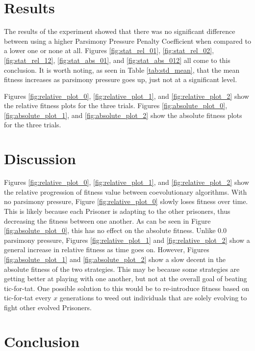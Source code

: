 \documentclass[times]{article}
\begin{document}
	\section{Results}

	The results of the experiment showed that there was no significant difference between using a higher Parsimony Pressure Penalty Coefficient when compared to a lower one or none at all. Figures \ref{fig:stat_rel_01}, \ref{fig:stat_rel_02}, \ref{fig:stat_rel_12}, \ref{fig:stat_abs_01}, and \ref{fig:stat_abs_012} all come to this conclusion. It is worth noting, as seen in Table \ref{tab:std_mean}, that the mean fitness increases as parsimony pressure goes up, just not at a significant level.

	Figures \ref{fig:relative_plot_0}, \ref{fig:relative_plot_1}, and \ref{fig:relative_plot_2} show the relative fitness plots for the three trials. Figures \ref{fig:absolute_plot_0}, \ref{fig:absolute_plot_1}, and \ref{fig:absolute_plot_2} show the absolute fitness plots for the three trials.

	\section{Discussion}

	Figures \ref{fig:relative_plot_0}, \ref{fig:relative_plot_1}, and \ref{fig:relative_plot_2} show the relative progression of fitness value between coevolutionary algorithms. With no parsimony pressure, Figure \ref{fig:relative_plot_0} slowly loses fitness over time. This is likely because each Prisoner is adapting to the other prisoners, thus decreasing the fitness between one another. As can be seen in Figure \ref{fig:absolute_plot_0}, this has no effect on the absolute fitness. Unlike $0.0$ parsimony pressure, Figures \ref{fig:relative_plot_1} and \ref{fig:relative_plot_2} show a general increase in relative fitness as time goes on. However, Figures \ref{fig:absolute_plot_1} and \ref{fig:absolute_plot_2} show a slow decent in the absolute fitness of the two strategies. This may be because some strategies are getting better at playing with one another, but not at the overall goal of beating tic-for-tat. One possible solution to this would be to re-introduce fitness based on tic-for-tat every $x$ generations to weed out individuals that are solely evolving to fight other evolved Prisoners.

	\section{Conclusion}
\end{document}
